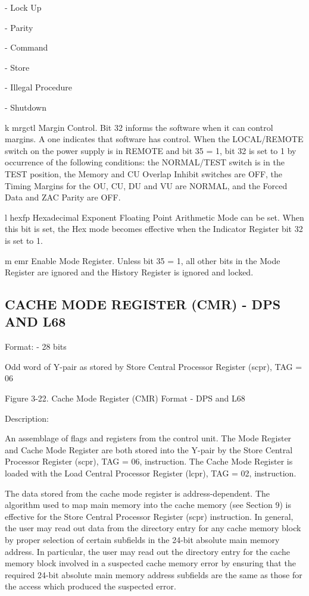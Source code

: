 - Lock Up

- Parity

- Command

- Store

- Illegal Procedure

- Shutdown

k mrgctl Margin Control. Bit 32 informs the software when it can control
margins.  A one indicates that software has control. When the LOCAL/REMOTE
switch on the power supply is in REMOTE and bit 35 = 1, bit 32 is set to 1 by
occurrence of the following conditions: the NORMAL/TEST switch is in the TEST
position, the Memory and CU Overlap Inhibit switches are OFF, the Timing
Margins for the OU, CU, DU and VU are NORMAL, and the Forced Data and ZAC
Parity are OFF.

l hexfp Hexadecimal Exponent Floating Point Arithmetic Mode can be set. When
this bit is set, the Hex mode becomes effective when the Indicator Register bit
32 is set to 1.

m emr Enable Mode Register. Unless bit 35 = 1, all other bits in the Mode
Register are ignored and the History Register is ignored and locked.

\subsection{CACHE MODE REGISTER (CMR) - DPS AND L68}

Format: - 28 bits

Odd word of Y-pair as stored by Store Central Processor Register (scpr), TAG = 06

Figure 3-22. Cache Mode Register (CMR) Format - DPS and L68

Description:

An assemblage of flags and registers from the control unit. The Mode Register
and Cache Mode Register are both stored into the Y-pair by the Store Central
Processor Register (scpr), TAG = 06, instruction. The Cache Mode Register is
loaded with the Load Central Processor Register (lcpr), TAG = 02, instruction.

The data stored from the cache mode register is address-dependent. The
algorithm used to map main memory into the cache memory (see Section 9) is
effective for the Store Central Processor Register (scpr) instruction. In
general, the user may read out data from the directory entry for any cache
memory block by proper selection of certain subfields in the 24-bit absolute
main memory address. In particular, the user may read out the directory entry
for the cache memory block involved in a suspected cache memory error by
ensuring that the required 24-bit absolute main memory address subfields are
the same as those for the access which produced the suspected error.

